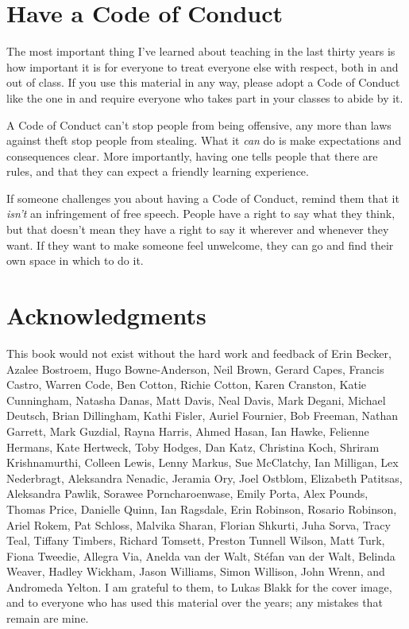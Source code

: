 \section{Have a Code of Conduct}\label{s:intro-code-of-conduct}

The most important thing I've learned about teaching in the last
thirty years is how important it is for everyone to treat everyone
else with respect, both in and out of class.  If you use this material
in any way, please adopt a Code of Conduct like the one in
 and require everyone who takes part in your classes
to abide by it.

A Code of Conduct can't stop people from being offensive, any more
than laws against theft stop people from stealing.  What it \emph{can}
do is make expectations and consequences clear.  More importantly,
having one tells people that there are rules, and that they can expect
a friendly learning experience.

If someone challenges you about having a Code of Conduct, remind them
that it \emph{isn't} an infringement of free speech.  People have a
right to say what they think, but that doesn't mean they have a right
to say it wherever and whenever they want.  If they want to make
someone feel unwelcome, they can go and find their own space in which
to do it.

\section{Acknowledgments}\label{s:intro-acknowledgments}

This book would not exist without the hard work and feedback of Erin
Becker, Azalee Bostroem, Hugo Bowne-Anderson, Neil Brown, Gerard
Capes, Francis Castro, Warren Code, Ben Cotton, Richie Cotton, Karen
Cranston, Katie Cunningham, Natasha Danas, Matt Davis, Neal Davis,
Mark Degani, Michael Deutsch, Brian Dillingham, Kathi Fisler, Auriel
Fournier, Bob Freeman, Nathan Garrett, Mark Guzdial, Rayna Harris,
Ahmed Hasan, Ian Hawke, Felienne Hermans, Kate Hertweck, Toby Hodges,
Dan Katz, Christina Koch, Shriram Krishnamurthi, Colleen Lewis, Lenny
Markus, Sue McClatchy, Ian Milligan, Lex Nederbragt, Aleksandra
Nenadic, Jeramia Ory, Joel Ostblom, Elizabeth Patitsas, Aleksandra
Pawlik, Sorawee Porncharoenwase, Emily Porta, Alex Pounds, Thomas
Price, Danielle Quinn, Ian Ragsdale, Erin Robinson, Rosario Robinson,
Ariel Rokem, Pat Schloss, Malvika Sharan, Florian Shkurti, Juha Sorva,
Tracy Teal, Tiffany Timbers, Richard Tomsett, Preston Tunnell Wilson,
Matt Turk, Fiona Tweedie, Allegra Via, Anelda van der Walt, St\'{e}fan
van der Walt, Belinda Weaver, Hadley Wickham, Jason Williams, Simon
Willison, John Wrenn, and Andromeda Yelton.  I am grateful to them, to
Lukas Blakk for the cover image, and to everyone who has used this
material over the years; any mistakes that remain are mine.

